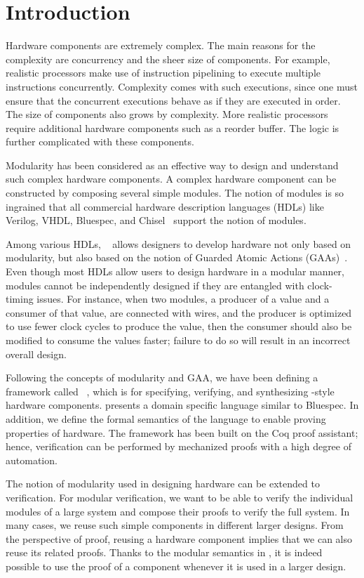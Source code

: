 \chapter{Introduction}

Hardware components are extremely complex. The main reasons for the
complexity are concurrency and the sheer size of components. For
example, realistic processors make use of instruction pipelining to
execute multiple instructions concurrently. Complexity comes with such
executions, since one must ensure that the concurrent executions
behave as if they are executed in order. The size of components also
grows by complexity. More realistic processors require additional
hardware components such as a reorder buffer. The logic is further
complicated with these components.

Modularity has been considered as an effective way to design and
understand such complex hardware components. A complex hardware
component can be constructed by composing several simple modules. The
notion of modules is so ingrained that all commercial hardware
description languages (HDLs) like Verilog, VHDL, Bluespec, and
Chisel~\cite{verilog, vhdl, bsdef, chisel} support the notion of
modules.

Among various HDLs, \Bluespec{}~\cite{bsdef, bsref} allows designers
to develop hardware not only based on modularity, but also based on
the notion of Guarded Atomic Actions (GAAs)~\cite{daniel-gaa}. Even
though most HDLs allow users to design hardware in a modular manner,
modules cannot be independently designed if they are entangled with
clock-timing issues. For instance, when two modules, a producer of a
value and a consumer of that value, are connected with wires, and the
producer is optimized to use fewer clock cycles to produce the value,
then the consumer should also be modified to consume the values
faster; failure to do so will result in an incorrect overall design.

Following the concepts of modularity and GAA, we have been defining a
framework called \Kami{}~\cite{kami-web, murali-thesis}, which is for
specifying, verifying, and synthesizing \Bluespec{}-style hardware
components. \Kami{} presents a domain specific language similar to
Bluespec. In addition, we define the formal semantics of the \Kami{}
language to enable proving properties of hardware. The framework has
been built on the Coq proof assistant; hence, verification can be
performed by mechanized proofs with a high degree of automation.

The notion of modularity used in designing hardware can be extended to
verification. For modular verification, we want to be able to verify
the individual modules of a large system and compose their proofs to
verify the full system. In many cases, we reuse such simple components
in different larger designs. From the perspective of proof, reusing a
hardware component implies that we can also reuse its related
proofs. Thanks to the modular semantics in \Kami{}, it is indeed
possible to use the proof of a component whenever it is used in a
larger design.

